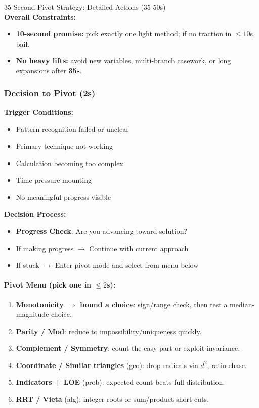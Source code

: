 \documentclass{article}
\newcommand{\timer}[1]{\textbf{\textcolor{timegreen}{#1}}}
\begin{document}
\begin{classifybox}{35-Second Pivot Strategy: Detailed Actions (35-50s)}
{\footnotesize\textcolor{timegreen}{}}\\

\textbf{Overall Constraints:}
\begin{itemize}[nosep]
\item \textbf{10-second promise:} pick exactly one light method; if no traction in \(\le 10\)s, bail.
\item \textbf{No heavy lifts:} avoid new variables, multi-branch casework, or long expansions after \timer{35s}.
\end{itemize}

\subsubsection{Decision to Pivot (2s)}
{\footnotesize\textcolor{timegreen}{}}

\textbf{Trigger Conditions:}
\begin{itemize}[nosep]
\item Pattern recognition failed or unclear
\item Primary technique not working
\item Calculation becoming too complex
\item Time pressure mounting
\item No meaningful progress visible
\end{itemize}

\textbf{Decision Process:}
\begin{itemize}[nosep]
\item \textbf{Progress Check}: Are you advancing toward solution?
\item If making progress $\rightarrow$ Continue with current approach
\item If stuck $\rightarrow$ Enter pivot mode and select from menu below
\end{itemize}

\paragraph{Pivot Menu (pick one in \(\le 2\)s):}
\begin{enumerate}[nosep]
\item \textbf{Monotonicity \(\Rightarrow\) bound a choice}: sign/range check, then test a median-magnitude choice.
\item \textbf{Parity / Mod}: reduce to impossibility/uniqueness quickly.
\item \textbf{Complement / Symmetry}: count the easy part or exploit invariance.
\item \textbf{Coordinate / Similar triangles} (geo): drop radicals via $d^2$, ratio-chase.
\item \textbf{Indicators + LOE} (prob): expected count beats full distribution.
\item \textbf{RRT / Vieta} (alg): integer roots or sum/product short-cuts.
\end{enumerate}


\end{classifybox}
\end{document}
